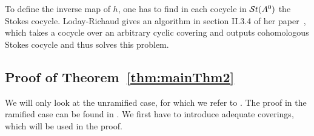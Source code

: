 \begin{rem}
  To define the inverse map of $h$, one has to find in each cocycle in
  $\mathcal{S}{}t(A^0)$ the Stokes cocycle. Loday-Richaud gives an algorithm in section
  II.3.4 of her paper~\cite{Loday1994}, which takes a cocycle over an arbitrary
  cyclic covering and outputs cohomologous Stokes cocycle and thus solves this
  problem.
\end{rem}

\subsection{Proof of Theorem~\ref{thm:mainThm2}}\label{sec:proofOfMatrixThm}
We will only look at the unramified case, for which we refer to
\cite[Sec.II.3]{Loday1994}.
The proof in the ramified case can be found in \cite[Sec.II.4]{Loday1994}.
We first have to introduce adequate coverings, which will be used in the proof.

